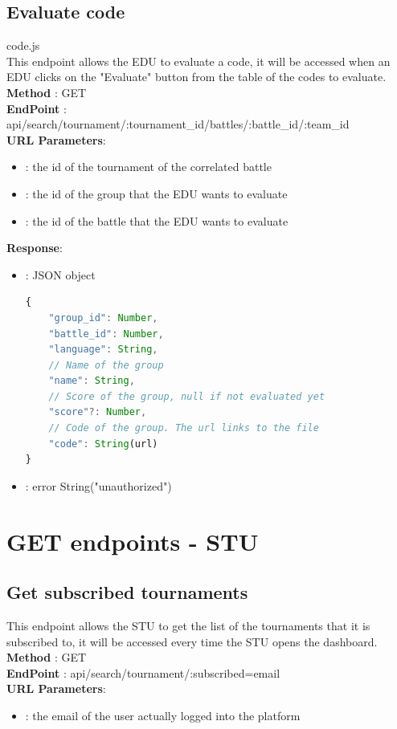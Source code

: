 \subsection*{Evaluate code}
code.js\\
This endpoint allows the EDU to evaluate a code, it will be accessed when an EDU clicks on the "Evaluate" button from the table of the codes to evaluate.\\
\textbf{Method} : GET \\
\textbf{EndPoint} : api/search/tournament/:tournament\_id/battles/:battle\_id/:team\_id     \\
\textbf{URL Parameters}:
\begin{itemize}
    \item {} : the id of the tournament of the correlated battle
    \item {}: the id of the group that the EDU wants to evaluate
    \item {}: the id of the battle that the EDU wants to evaluate
\end{itemize}
\textbf{Response}:
\begin{itemize}
    \item {} : JSON object
          \begin{lstlisting}[language=JavaScript, label={lst:jscode}, basicstyle=\ttfamily]
{
    "group_id": Number,
    "battle_id": Number,
    "language": String,
    // Name of the group
    "name": String,
    // Score of the group, null if not evaluated yet
    "score"?: Number,
    // Code of the group. The url links to the file
    "code": String(url)
}
    \end{lstlisting}
    \item {} : error String("unauthorized")
\end{itemize}

\section*{GET endpoints - STU}

\subsection*{Get subscribed tournaments}
This endpoint allows the STU to get the list of the tournaments that it is subscribed to, it will be accessed every time the STU opens the dashboard.\\
\textbf{Method} : GET \\
\textbf{EndPoint} : api/search/tournament/:subscribed=email     \\
\textbf{URL Parameters}:
    \begin{itemize}
        \item {} : the email of the user actually logged into the platform
    \end{itemize}


